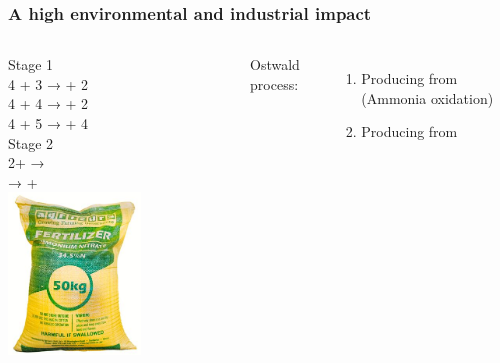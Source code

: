 \begin{frame}
    \frametitle{A high environmental and industrial impact}
    \medskip
    \begin{columns}

            \centering 
            Stage 1
            \smallskip\\
            \small
            4 \ammonia + 3 \dioxygen → \ce{6 \water} + 2 \nitrogen\\
            4 \ammonia + 4 \dioxygen → \ce{6 \water} + 2 \nitrousoxide\\
            4 \ammonia + 5 \dioxygen → \ce{6 \water} + 4 \nitricoxide \\

            \bigskip
            \normalsize
            Stage 2
            \smallskip\\
            \small
            2\nitricoxide + \dioxygen → \\
             → \nitricacid + \nitricoxide\\

            \bigskip
            \includegraphics[width=0.6\textwidth]{Figures/ammonia/fertilizer.png}

            \textcolor{Important}{{Ostwald process:}}
            \begin{enumerate}
                \item Producing \nitricoxide from \ammonia (Ammonia oxidation)
                \pause
                \item Producing \nitricacid from \nitricoxide
            \end{enumerate}


\end{columns}
\end{frame}
